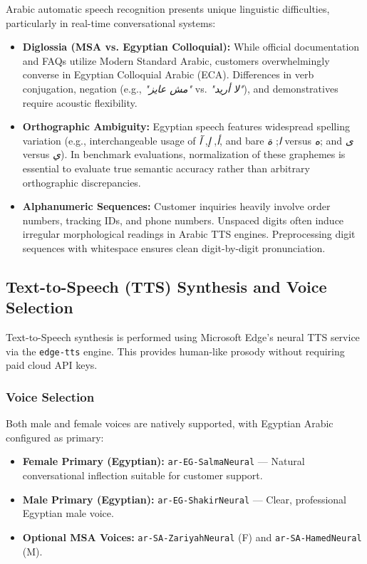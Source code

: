 Arabic automatic speech recognition presents unique linguistic difficulties, particularly in real-time conversational systems:
\begin{itemize}
    \item \textbf{Diglossia (MSA vs. Egyptian Colloquial):} While official documentation and FAQs utilize Modern Standard Arabic, customers overwhelmingly converse in Egyptian Colloquial Arabic (ECA). Differences in verb conjugation, negation (e.g., \textit{"مش عايز"} vs. \textit{"لا أريد"}), and demonstratives require acoustic flexibility.
    \item \textbf{Orthographic Ambiguity:} Egyptian speech features widespread spelling variation (e.g., interchangeable usage of \textit{أ}, \textit{إ}, \textit{آ}, and bare \textit{ا}; \textit{ة} versus \textit{ه}; and \textit{ى} versus \textit{ي}). In benchmark evaluations, normalization of these graphemes is essential to evaluate true semantic accuracy rather than arbitrary orthographic discrepancies.
    \item \textbf{Alphanumeric Sequences:} Customer inquiries heavily involve order numbers, tracking IDs, and phone numbers. Unspaced digits often induce irregular morphological readings in Arabic TTS engines. Preprocessing digit sequences with whitespace ensures clean digit-by-digit pronunciation.
\end{itemize}

\subsection{Text-to-Speech (TTS) Synthesis and Voice Selection}
\label{subsec:tts_design}

Text-to-Speech synthesis is performed using Microsoft Edge's neural TTS service via the \texttt{edge-tts} engine. This provides human-like prosody without requiring paid cloud API keys.

\subsubsection{Voice Selection}
Both male and female voices are natively supported, with Egyptian Arabic configured as primary:
\begin{itemize}
    \item \textbf{Female Primary (Egyptian):} \texttt{ar-EG-SalmaNeural} --- Natural conversational inflection suitable for customer support.
    \item \textbf{Male Primary (Egyptian):} \texttt{ar-EG-ShakirNeural} --- Clear, professional Egyptian male voice.
    \item \textbf{Optional MSA Voices:} \texttt{ar-SA-ZariyahNeural} (F) and \texttt{ar-SA-HamedNeural} (M).
\end{itemize}

